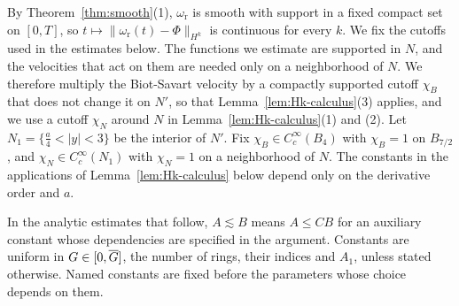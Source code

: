 By Theorem~\ref{thm:smooth}\textup{(1)}, $\omega_{\mathrm r}$ is smooth with
support in a fixed compact set on $[0,T]$, so
$t\mapsto\|\omega_{\mathrm r}(t)-\Phi\|_{H^k}$ is continuous for every $k$.
We fix the cutoffs used in the estimates below. The functions we estimate are
supported in $N$, and the velocities that act on them are needed only on a
neighborhood of $N$. We therefore multiply the Biot-Savart velocity by a compactly
supported cutoff $\chi_B$ that does not change it on $N'$, so that
Lemma~\ref{lem:Hk-calculus}\textup{(3)} applies, and we use a cutoff $\chi_N$ around $N$ in Lemma~\ref{lem:Hk-calculus}\textup{(1)}
and \textup{(2)}. Let $N_1=\{\frac a4<|y|<3\}$ be
the interior of $N'$. Fix $\chi_B\in C_c^\infty(B_4)$ with $\chi_B=1$ on $B_{7/2}$,
and $\chi_N\in C_c^\infty(N_1)$ with $\chi_N=1$ on a neighborhood of $N$.
The constants in the applications of Lemma~\ref{lem:Hk-calculus} below
depend only on the derivative order and $a$.

In the analytic estimates that follow, $A\lesssim B$ means $A\le CB$ for
an auxiliary constant whose dependencies are specified in the argument.
Constants are uniform in $G\in[0,\overline{G}]$, the number of rings, their indices
and $A_1$, unless stated otherwise. Named constants are fixed before the
parameters whose choice depends on them.

